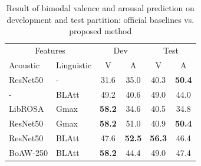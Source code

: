 \begin{table}
  \caption{Result of bimodal valence and arousal prediction on development and test partition: official baselines vs. proposed method}
  \label{tab:bimodal_result}
  \begin{center}
  \begin{tabular}{l l c c c c}
    \hline
\multicolumn{2}{c}{Features} & \multicolumn{2}{c}{Dev} &
\multicolumn{2}{c}{Test} \\
Acoustic  & Linguistic  & V & A & V & A \\
\hline \hline
ResNet50 \cite{Schuller}  & - & 31.6  & 35.0  & 40.3  & \textbf{50.4}\\
- & BLAtt \cite{Schuller} & 49.2  & 40.6  & 49.0  & 44.0 \\
LibROSA & Gmax  & \textbf{58.2} & 34.6  & 40.5  & 34.8 \\
ResNet50  & Gmax  & \textbf{58.2} & 51.0  & 40.9  & \textbf{50.4} \\
ResNet50  & BLAtt & 47.6  & \textbf{52.5} & \textbf{56.3} & 46.4 \\
BoAW-250  & BLAtt & \textbf{58.2} & 44.4  & 49.0  & 47.4 \\
\hline
  \end{tabular}
\end{center}
\end{table}



